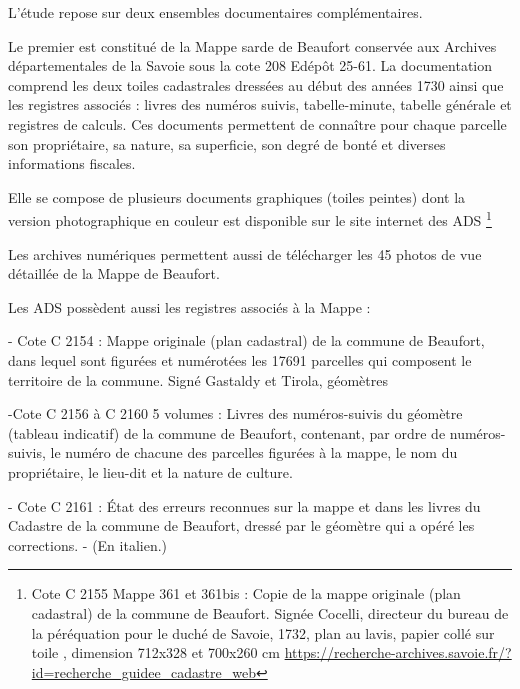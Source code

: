 \documentclass[12pt,a4paper]{report}
\begin{document}
L'étude repose sur deux ensembles documentaires complémentaires.

Le premier est constitué de la Mappe sarde de Beaufort conservée aux Archives départementales de la Savoie sous la cote 208 Edépôt 25-61. La documentation comprend les deux toiles cadastrales dressées au début des années 1730 ainsi que les registres associés : livres des numéros suivis, tabelle-minute, tabelle générale et registres de calculs. Ces documents permettent de connaître pour chaque parcelle son propriétaire, sa nature, sa superficie, son degré de bonté et diverses informations fiscales.

Elle se compose de plusieurs documents graphiques (toiles peintes) dont la version photographique en couleur est disponible sur le site internet des ADS \footnote{Cote C 2155 Mappe 361 et 361bis : Copie de la mappe originale (plan cadastral) de la commune de Beaufort. Signée Cocelli, directeur du bureau de la péréquation pour le duché de Savoie, 1732, plan au lavis, papier collé sur toile , dimension 712x328 et 700x260 cm \url{https://recherche-archives.savoie.fr/?id=recherche_guidee_cadastre_web}}

Les archives numériques permettent aussi de télécharger les 45 photos de vue détaillée de la Mappe de Beaufort.

Les ADS possèdent aussi les registres associés à la Mappe : 

- Cote C 2154 : Mappe originale (plan cadastral) de la commune de Beaufort, dans lequel sont figurées et numérotées les 17691 parcelles qui composent le territoire de la commune. Signé Gastaldy et Tirola, géomètres

-Cote C 2156 à C 2160 5 volumes : Livres des numéros-suivis du géomètre (tableau indicatif) de la commune de Beaufort, contenant, par ordre de numéros-suivis, le numéro de chacune des parcelles figurées à la mappe, le nom du propriétaire, le lieu-dit et la nature de culture. 

- Cote C 2161 : État des erreurs reconnues sur la mappe et dans les livres du Cadastre de la commune de Beaufort, dressé par le géomètre qui a opéré les corrections. - (En italien.)
\end{document}
